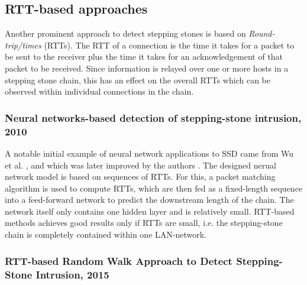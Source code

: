 \documentclass[runningheads]{llncs}\usepackage[]{graphicx}\usepackage[]{color}
\begin{document}
\subsection{RTT-based approaches}

Another prominent approach to detect stepping stones is based on \textit{Round-trip/times} (RTTs). The RTT of a connection is the time it takes for a packet to be sent to the receiver plus the time it takes for an acknowledgement of that packet to be received. Since information is relayed over one or more hosts in a stepping stone chain, this has an effect on the overall RTTs which can be observed within individual connections in the chain.


\subsubsection{Neural networks-based detection of stepping-stone intrusion, 2010}

A notable initial example of neural network applications to SSD came from Wu et al. \cite{wu2008performance}, and which was later improved by the authors \cite{wu2008performance}.
The designed nerual network model is based on sequences of RTTs. For this, a packet matching algorithm is used to compute RTTs, which are then fed as a fixed-length sequence into a feed-forward network to predict the downstream length of the chain. The network itself only contains one hidden layer and is relatively small. RTT-based methods achieves good results only if RTTs are small, i.e. the stepping-stone chain is completely contained within one LAN-network.


\subsubsection{RTT-based Random Walk Approach to Detect Stepping-Stone Intrusion, 2015}
\end{document}

